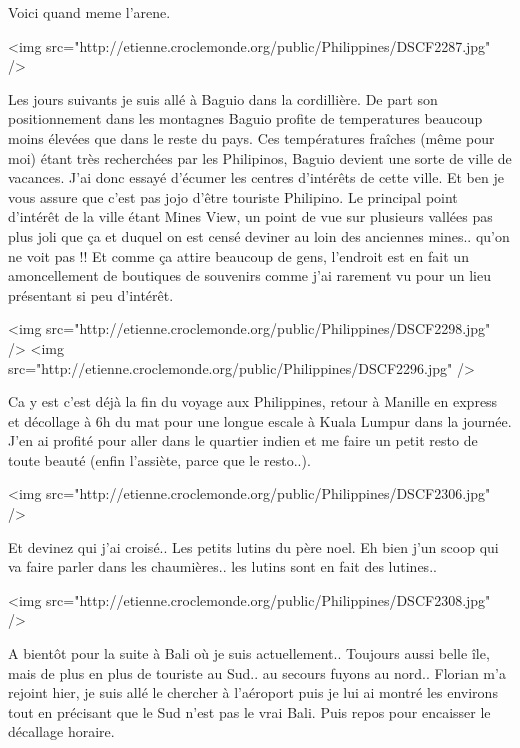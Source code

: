 Voici quand meme l'arene.

<img src="http://etienne.croclemonde.org/public/Philippines/DSCF2287.jpg" />

Les jours suivants je suis allé à Baguio dans la cordillière. De part son positionnement dans les montagnes Baguio profite de temperatures beaucoup moins élevées que dans le reste du pays. Ces températures fraîches (même pour moi) étant très recherchées par les Philipinos, Baguio devient une sorte de ville de vacances. J'ai donc essayé d'écumer les centres d'intérêts de cette ville. Et ben je vous assure que c'est pas jojo d'être touriste Philipino. Le principal point d'intérêt de la ville étant Mines View, un point de vue sur plusieurs vallées pas plus joli que ça et duquel on est censé deviner au loin des anciennes mines.. qu'on ne voit pas !! Et comme ça attire beaucoup de gens, l'endroit est en fait un amoncellement de boutiques de souvenirs comme j'ai rarement vu pour un lieu présentant si peu d'intérêt.

<img src="http://etienne.croclemonde.org/public/Philippines/DSCF2298.jpg" />
<img src="http://etienne.croclemonde.org/public/Philippines/DSCF2296.jpg" />

Ca y est c'est déjà la fin du voyage aux Philippines, retour à Manille en express et décollage à 6h du mat pour une longue escale à Kuala Lumpur dans la journée. J'en ai profité pour aller dans le quartier indien et me faire un petit resto de toute beauté (enfin l'assiète, parce que le resto..).

<img src="http://etienne.croclemonde.org/public/Philippines/DSCF2306.jpg" />

Et devinez qui j'ai croisé.. Les petits lutins du père noel. Eh bien j'un scoop qui va faire parler dans les chaumières.. les lutins sont en fait des lutines..

<img src="http://etienne.croclemonde.org/public/Philippines/DSCF2308.jpg" />

A bientôt pour la suite à Bali où je suis actuellement.. Toujours aussi belle île, mais de plus en plus de touriste au Sud.. au secours fuyons au nord.. Florian m'a rejoint hier, je suis allé le chercher à l'aéroport puis je lui ai montré les environs tout en précisant que le Sud n'est pas le vrai Bali. Puis repos pour encaisser le décallage horaire.
